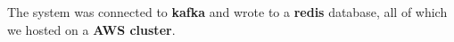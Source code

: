 \documentclass[a4paper]{deedy-resume} %
\begin{document}
\begin{minipage}[t]{0.62\textwidth}
The system was connected to \textbf{kafka} and wrote to a \textbf{redis} database, all of which we hosted on a \textbf{AWS cluster}.

\sectionspace





\end{minipage}
\end{document}
